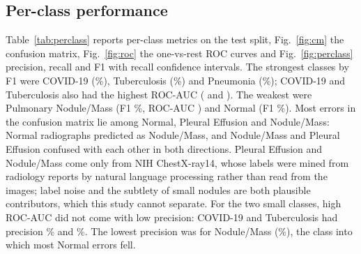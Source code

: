 \subsection{Per-class performance}
\label{sec:res-perclass}
Table~\ref{tab:perclass} reports per-class metrics on the test split, Fig.~\ref{fig:cm} the confusion matrix, Fig.~\ref{fig:roc} the one-vs-rest ROC curves and Fig.~\ref{fig:perclass} precision, recall and F1 with recall confidence intervals.
The strongest classes by F1 were COVID-19 (\RFOneCovid\%), Tuberculosis (\RFOneTB\%) and Pneumonia (\RFOnePneumonia\%); COVID-19 and Tuberculosis also had the highest ROC-AUC (\RAUCCovid{} and \RAUCTB). The weakest were Pulmonary Nodule/Mass (F1 \RFOneNodule\%, ROC-AUC \RAUCNodule) and Normal (F1 \RFOneNormal\%). Most errors in the confusion matrix lie among Normal, Pleural Effusion and Nodule/Mass: Normal radiographs predicted as Nodule/Mass, and Nodule/Mass and Pleural Effusion confused with each other in both directions. Pleural Effusion and Nodule/Mass come only from NIH ChestX-ray14, whose labels were mined from radiology reports by natural language processing rather than read from the images; label noise and the subtlety of small nodules are both plausible contributors, which this study cannot separate. For the two small classes, high ROC-AUC did not come with low precision: COVID-19 and Tuberculosis had precision \RPrecisionCovid\% and \RPrecisionTB\%. The lowest precision was for Nodule/Mass (\RPrecisionNodule\%), the class into which most Normal errors fell.

